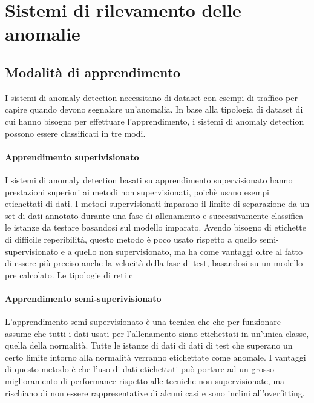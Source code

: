 \section{Sistemi di rilevamento delle anomalie}

\subsection{Modalità di apprendimento}


I sistemi di anomaly detection necessitano di dataset con esempi di traffico per capire quando devono segnalare un'anomalia. In base alla tipologia di dataset di cui hanno bisogno per effettuare l'apprendimento, i sistemi di anomaly detection possono essere classificati in tre modi.

\paragraph{Apprendimento superivisionato}

I sistemi di anomaly detection basati su apprendimento supervisionato hanno prestazioni superiori ai metodi non supervisionati, poichè usano esempi etichettati di dati. I metodi supervisionati imparano il limite di separazione da un set di dati annotato durante una fase di allenamento e successivamente classifica le istanze da testare basandosi sul modello imparato. Avendo bisogno di etichette di difficile reperibilità, questo metodo è poco usato rispetto a quello semi-supervisionato e a quello non supervisionato, ma ha come vantaggi oltre al fatto di essere più preciso anche la velocità della fase di test, basandosi su un modello pre calcolato.
Le tipologie di reti c

\paragraph{Apprendimento semi-superivisionato}

L'apprendimento semi-supervisionato è una tecnica che che per funzionare assume che tutti i dati usati per l'allenamento siano etichettati in un'unica classe, quella della normalità. Tutte le istanze di dati di dati di test che superano un certo limite intorno alla normalità verranno etichettate come anomale. I vantaggi di questo metodo è che l'uso di dati etichettati può portare ad un grosso miglioramento di performance rispetto alle tecniche non supervisionate, ma rischiano di non essere rappresentative di alcuni casi e sono inclini all'overfitting.

